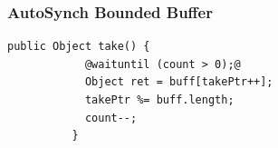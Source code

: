\documentclass[mathserif,14pt,xcolor=table]{beamer}
\begin{document}

\begin{frame}[fragile]
    \frametitle{AutoSynch Bounded Buffer}
    \begin{lstlisting}[style=base]
          public Object take() {
            @waituntil (count > 0);@
            Object ret = buff[takePtr++];
            takePtr %= buff.length;
            count--;
          }
    \end{lstlisting}
\end{frame}

%        
%        
%        

\end{document}
